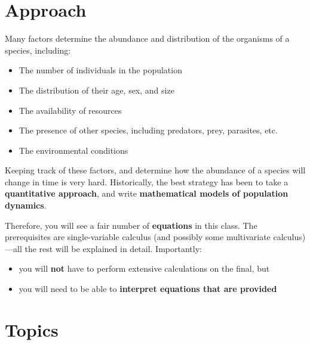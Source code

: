 \documentclass[
  letterpaper,
]{scrbook}
\providecommand{\tightlist}{%
  \setlength{\itemsep}{0pt}\setlength{\parskip}{0pt}}\usepackage{longtable,booktabs,array}
\begin{document}
\section{Approach}\label{approach}

Many factors determine the abundance and distribution of the organisms
of a species, including:

\begin{itemize}
\tightlist
\item
  The number of individuals in the population
\item
  The distribution of their age, sex, and size
\item
  The availability of resources
\item
  The presence of other species, including predators, prey, parasites,
  etc.
\item
  The environmental conditions
\end{itemize}

Keeping track of these factors, and determine how the abundance of a
species will change in time is very hard. Historically, the best
strategy has been to take a \textbf{quantitative approach}, and write
\textbf{mathematical models of population dynamics}.

Therefore, you will see a fair number of \textbf{equations} in this
class. The prerequisites are single-variable calculus (and possibly some
multivariate calculus)---all the rest will be explained in detail.
Importantly:

\begin{itemize}
\tightlist
\item
  you will \textbf{not} have to perform extensive calculations on the
  final, but
\item
  you will need to be able to \textbf{interpret equations that are
  provided}
\end{itemize}

\section{Topics}\label{topics}
\end{document}
